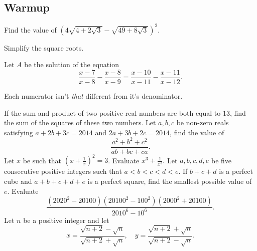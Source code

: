 \documentclass[../jarvis.tex]{subfiles}
\begin{document}
\subsection{Warmup}
\problem[2015 SMO(J) P9]Find the value of $\left(4\sqrt{4+2\sqrt{3}}-\sqrt{49+8\sqrt{3}}\right)^2.$
\begin{hints}
    \begin{hint}
        Simplify the square roots.
    \end{hint}
\end{hints}
\problem[2014 SMO(J) P13]Let $A$ be the solution of the equation
$$\frac{x-7}{x-8}-\frac{x-8}{x-9}=\frac{x-10}{x-11}-\frac{x-11}{x-12}.$$
\begin{hints}
    \begin{hint}
        Each numerator isn't \textit{that} different from it's denominator.
    \end{hint}
\end{hints}
\problem[2016 SMO(J) P11]If the sum and product of two positive real numbers are both equal to $13$, find the sum of the squares of these two numbers.
\problem[2014 SMO(J) P23]Let $a,b,c$ be non-zero reals satisfying $a+2b+3c=2014$ and $2a+3b+2c=2014$, find the value of 
$$\frac{a^2+b^2+c^2}{ab+bc+ca}.$$
\problem[2014 SMO(J) P26]Let $x$ be such that $\left(x+\frac{1}{x}\right)^2=3$. Evaluate $x^3+\frac{1}{x^3}.$
\problem[2014/15 SDML 2A/P5]Let $a,b,c,d,e$ be five consecutive positive integers such that $a<b<c<d<e$. If $b+c+d$ is a perfect cube and $a+b+c+d+e$ is a perfect square, find the smallest possible value of $e$.
\problem[2008 SMO(J) P23]Evaluate 
$$\frac{(2020^2-20100)(20100^2-100^2)(2000^2+20100)}{2010^6-10^6}.$$
\problem[2014 SMO(S) P23]Let $n$ be a positive integer and let
$$x=\frac{\sqrt{n+2}-\sqrt{n}}{\sqrt{n+2}+\sqrt{n}},\quad y=\frac{\sqrt{n+2}+\sqrt{n}}{\sqrt{n+2}-\sqrt{n}}.$$
\end{document}
